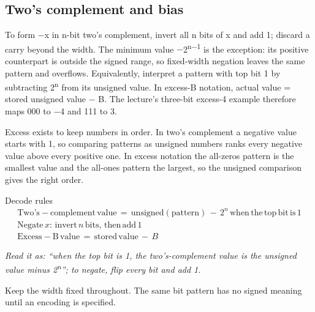 \documentclass[11pt]{article}
\begin{document}
\begin{keepsection}
\begin{keepsection}
\subsection{Two’s complement and bias}

To form \ensuremath{-}x in n-bit two’s complement, invert all n bits of x and add 1; discard a carry beyond the width. The minimum value \ensuremath{-}2\textsuperscript{n\ensuremath{-}1} is the exception: its positive counterpart is outside the signed range, so fixed-width negation leaves the same pattern and overflows. Equivalently, interpret a pattern with top bit 1 by subtracting 2\textsuperscript{n} from its unsigned value. In excess-B notation, actual value = stored unsigned value \ensuremath{-} B. The lecture’s three-bit excess-4 example therefore maps 000 to \ensuremath{-}4 and 111 to 3.

Excess exists to keep numbers in order. In two’s complement a negative value starts with 1, so comparing patterns as unsigned numbers ranks every negative value above every positive one. In excess notation the all-zeros pattern is the smallest value and the all-ones pattern the largest, so the unsigned comparison gives the right order.

\begin{equationcard}{Decode rules}
\[ \begin{gathered} \text{Two}’\mathrm{s}-\text{complement}\, \text{value}\, =\, \text{unsigned}(\text{pattern})\, -\, 2^{{n}}\, \text{when}\, \text{the}\, \text{top}\, \text{bit}\, \text{is}\, 1 \\ \text{Negate}\, {x}:\, \text{invert}\, {n}\, \text{bits},\, \text{then}\, \text{add}\, 1 \\ \text{Excess}-\mathrm{B}\, \text{value}\, =\, \text{stored}\, \text{value}\, -\, {B} \end{gathered} \]
{\small \emph{Read it as: “when the top bit is 1, the two’s-complement value is the unsigned value minus 2\textsuperscript{n}”; to negate, flip every bit and add 1.}\par Keep the width fixed throughout. The same bit pattern has no signed meaning until an encoding is specified.}
\end{equationcard}


\end{keepsection}
\end{keepsection}
\end{document}
